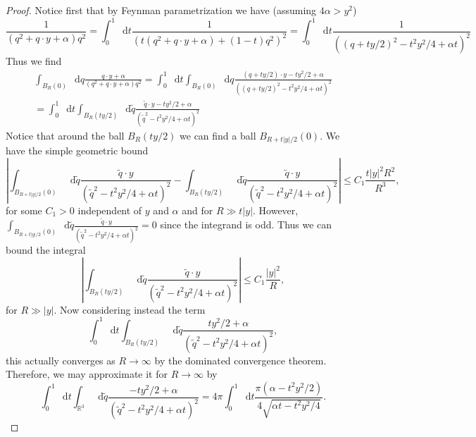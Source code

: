 \documentclass[a4paper,11pt]{article}
\newcommand{\abs}[1]{\left\lvert #1 \right\rvert}
\newcommand*\diff{\mathop{}\!\mathrm{d}}
\newcommand{\R}{\mathbb{R}}
\numberwithin{equation}{section}
\begin{document}
\begin{proof}
 Notice first that by Feynman parametrization we have (assuming $ 4\alpha>y^2 $) \begin{equation}
\frac{1}{(q^2+q\cdot y+\alpha)q^2}=\int_{0}^{1} \diff t \frac{1}{(t(q^2+q\cdot y+\alpha)+(1-t)q^2)^2}=\int_{0}^{1} \diff t \frac{1}{((q+ty/2)^2-t^2y^2/4+\alpha t)^2}
\end{equation}
Thus we find \begin{equation}
\begin{aligned}
\int_{B_R(0)} \diff q\frac{q\cdot y+\alpha}{(q^2+q\cdot y+\alpha)q^2}=\int_{0}^{1}\diff t\int_{B_R(0)} \diff q\frac{(q+ty/2)\cdot y-ty^2/2+\alpha}{((q+ty/2)^2-t^2y^2/4+\alpha t)^2}\\
=\int_{0}^{1}\diff t\int_{B_R(ty/2)} \diff \tilde{q}\frac{\tilde{q}\cdot y-ty^2/2+\alpha}{(\tilde{q}^2-t^2y^2/4+\alpha t)^2}
\end{aligned}
\end{equation}
Notice that around the ball $ B_R(ty/2) $ we can find a ball $ B_{R+t\abs{y}/2}(0) $. We have the simple geometric bound \begin{equation}
\abs{\int_{B_{R+t\abs{y}/2}(0)} \diff \tilde{q}\frac{\tilde{q}\cdot y}{(\tilde{q}^2-t^2y^2/4+\alpha t)^2}-\int_{B_R(ty/2)} \diff \tilde{q}\frac{\tilde{q}\cdot y}{(\tilde{q}^2-t^2y^2/4+\alpha t)^2}}\leq C_1\frac{t\abs{y}^2R^2}{R^3},
\end{equation}
for some $ C_1>0 $ independent of $ y $ and $ \alpha $ and for $ R\gg t\abs{y} $. However, $ \int_{B_{R+t\abs{y}/2}(0)} \diff \tilde{q}\frac{\tilde{q}\cdot y}{(\tilde{q}^2-t^2y^2/4+\alpha t)^2}=0 $ since the integrand is odd. Thus we can bound the integral\begin{equation}
\abs{\int_{B_R(ty/2)} \diff \tilde{q}\frac{\tilde{q}\cdot y}{(\tilde{q}^2-t^2y^2/4+\alpha t)^2}}\leq C_1\frac{\abs{y}^2}{R},\label{IntBound1}
\end{equation}
for $ R\gg\abs{y} $.
Now considering instead the term \begin{equation}
\int_{0}^{1}\diff t\int_{B_R(ty/2)} \diff \tilde{q}\frac{ty^2/2+\alpha}{(\tilde{q}^2-t^2y^2/4+\alpha t)^2},
\end{equation}
this actually converges as $ R\to\infty $ by the dominated convergence theorem. Therefore, we may approximate it for $ R\to\infty $ by \begin{equation}
\int_{0}^{1}\diff t\int_{\R^3} \diff \tilde{q}\frac{-ty^2/2+\alpha}{(\tilde{q}^2-t^2y^2/4+\alpha t)^2}=4\pi\int_{0}^{1}\diff t \frac{\pi(\alpha-t^2y^2/2)}{4\sqrt{\alpha t-t^2y^2/4}}.

\end{equation}
\end{proof}
\end{document}

